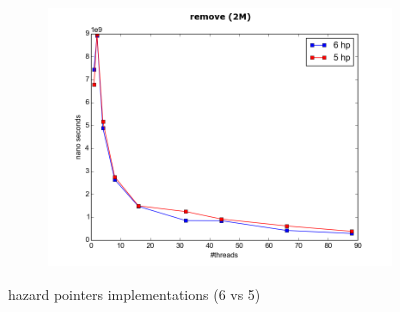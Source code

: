 \documentclass[conference]{IEEEtran}
\begin{document}
\begin{figure}
\begin{subfigure}{.5\textwidth}
			\includegraphics[width=0.45\paperwidth]{hp_comapre/remove_2M_5hp.png}
			\label{fig:5hp_remove}
		\end{subfigure}
		\caption{hazard pointers implementations (6 vs 5)}
		\label{fig:5_hazard_pointers_implementations}
	\end{figure}
\end{document}
